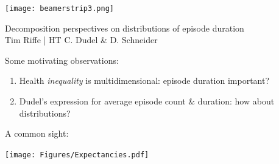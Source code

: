 \documentclass[20pt,usenames,dvipsnames]{beamer}
\begin{document}

\begin{frame}[plain]
	\vspace{-3cm}
 \centerline{\texttt{[image: beamerstrip3.png]}}

	\huge
	\vspace{1em}
	
	Decomposition perspectives on distributions of episode duration \\
	\vspace{1em}
	\large 
	Tim Riffe \pause | HT C. Dudel \& D. Schneider
\end{frame}

\begin{frame}[plain]
\Large
\centering
 Some motivating observations:\vspace{2em}
 \begin{enumerate}[<+->]
 \item Health \emph{inequality} is multidimensional: episode duration important? 
 \item Dudel's expression for average episode count \& duration: how about distributions?
 \end{enumerate}
\end{frame}

\begin{frame}[plain]
\Large
A common sight:\vspace{-1em}
\begin{center}
\texttt{[image: Figures/Expectancies.pdf]}
\end{center}
\end{frame}
\end{document}
